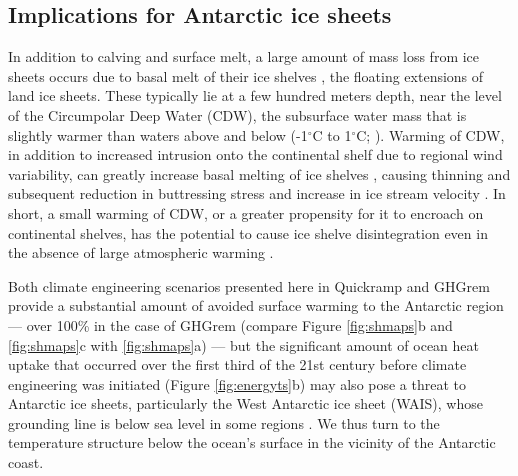 \documentclass[grl]{AGUTeX}  %
\begin{document}
\begin{article}
\section{Implications for Antarctic ice sheets}

In addition to calving and surface melt, a large amount of mass loss from ice sheets occurs due to basal melt of their ice shelves \citep{joughin11}, the floating extensions of land ice sheets. These typically lie at a few hundred meters depth, near the level of the Circumpolar Deep Water (CDW), the subsurface water mass that is slightly warmer than waters above and below (-1$^\circ$C to 1$^\circ$C; \cite{yin11}). Warming of CDW, in addition to increased intrusion onto the continental shelf due to regional wind variability, can greatly increase basal melting of ice shelves \citep{joughin11,thoma08}, causing thinning and subsequent reduction in buttressing stress and increase in ice stream velocity \citep{oppenheimer98}. In short, a small warming of CDW, or a greater propensity for it to encroach on continental shelves, has the potential to cause ice shelve disintegration even in the absence of large atmospheric warming \citep{oppenheimer98}.

Both climate engineering scenarios presented here in Quickramp and GHGrem provide a substantial amount of avoided surface warming to the Antarctic region --- over 100\% in the case of GHGrem (compare Figure \ref{fig:shmaps}b and \ref{fig:shmaps}c with \ref{fig:shmaps}a) --- but the significant amount of ocean heat uptake that occurred over the first third of the 21st century before climate engineering was initiated (Figure \ref{fig:energyts}b) may also pose a threat to Antarctic ice sheets, particularly the West Antarctic ice sheet (WAIS), whose grounding line is below sea level in some regions \citep{joughin11}. We thus turn to the temperature structure below the ocean's surface in the vicinity of the Antarctic coast. 


\end{article}
\end{document}
